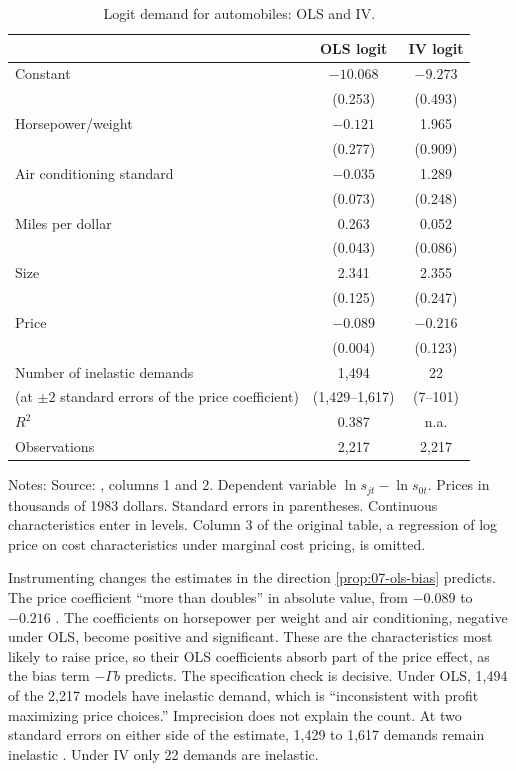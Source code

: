 \begin{table}[htbp]
\centering
\caption{Logit demand for automobiles: OLS and IV.}
\label{tab:07-blp-logit}
\footnotesize
\begin{tabular}{lcc}
\toprule
 & OLS logit & IV logit \\
\midrule
Constant & $-10.068$ & $-9.273$ \\
 & (0.253) & (0.493) \\
Horsepower/weight & $-0.121$ & 1.965 \\
 & (0.277) & (0.909) \\
Air conditioning standard & $-0.035$ & 1.289 \\
 & (0.073) & (0.248) \\
Miles per dollar & 0.263 & 0.052 \\
 & (0.043) & (0.086) \\
Size & 2.341 & 2.355 \\
 & (0.125) & (0.247) \\
Price & $-0.089$ & $-0.216$ \\
 & (0.004) & (0.123) \\
\midrule
Number of inelastic demands & 1,494 & 22 \\
\quad (at $\pm 2$ standard errors of the price coefficient) & (1,429--1,617) & (7--101) \\
$R^2$ & 0.387 & n.a. \\
Observations & 2,217 & 2,217 \\
\bottomrule
\end{tabular}
\par\smallskip
\parbox{\linewidth}{\footnotesize Notes: Source: \citet[Table~III, p.~873]{BerryLevinsohnPakes1995}, columns 1 and 2.
Dependent variable $\ln s_{jt} - \ln s_{0t}$. Prices in thousands of 1983 dollars. Standard errors in parentheses.
Continuous characteristics enter in levels. Column 3 of the original table, a regression of log price on cost
characteristics under marginal cost pricing, is omitted.}
\end{table}

Instrumenting changes the estimates in the direction \cref{prop:07-ols-bias} predicts. The price coefficient ``more than
doubles'' in absolute value, from $-0.089$ to $-0.216$ \citep[p.~873]{BerryLevinsohnPakes1995}. The coefficients on
horsepower per weight and air conditioning, negative under OLS, become positive and significant. These are the
characteristics most likely to raise price, so their OLS coefficients absorb part of the price effect, as the bias term
$-\Gamma b$ predicts. The specification check is decisive. Under OLS, 1,494 of the 2,217 models have inelastic demand,
which is ``inconsistent with profit maximizing price choices.'' Imprecision does not explain the count. At two
standard errors on either side of the estimate, 1,429 to 1,617 demands remain inelastic
\citep[p.~872]{BerryLevinsohnPakes1995}. Under IV only 22 demands are inelastic.

